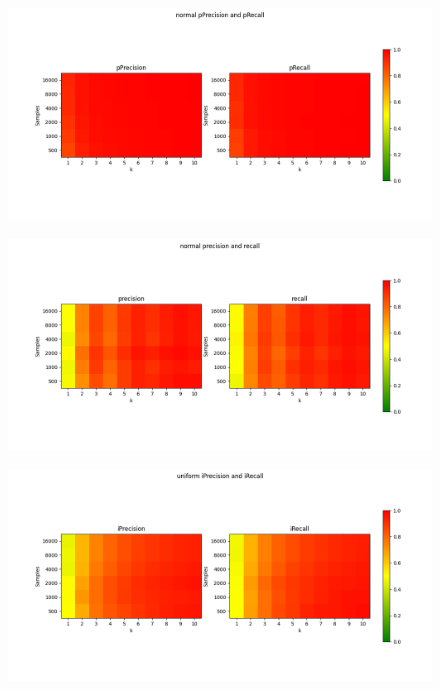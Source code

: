     \begin{figure}
        \centering
        \includegraphics[width=\linewidth]{../images/toyexperiments/kdim/normal_pPrecision_pRecall.png}
    \end{figure}

    \begin{figure}
        \centering
        \includegraphics[width=\linewidth]{../images/toyexperiments/kdim/normal_precision_recall.png}
    \end{figure}

    \begin{figure}
        \centering
        \includegraphics[width=\linewidth]{../images/toyexperiments/kdim/uniform_iPrecision_iRecall.png}
    \end{figure}

